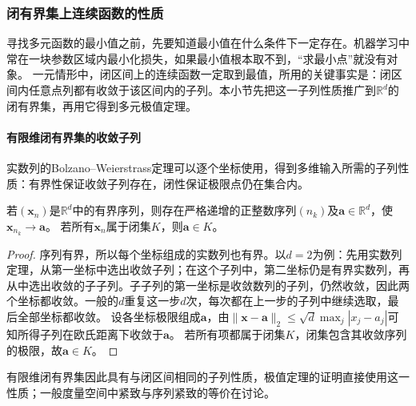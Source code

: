 \subsubsection{闭有界集上连续函数的性质}

寻找多元函数的最小值之前，先要知道最小值在什么条件下一定存在。机器学习中常在一块参数区域内最小化损失，如果最小值根本取不到，“求最小点”就没有对象。
一元情形中，闭区间上的连续函数一定取到最值，所用的关键事实是：闭区间内任意点列都有收敛于该区间内的子列。本小节先把这一子列性质推广到$\mathbb R^d$的闭有界集，再用它得到多元极值定理。

\paragraph{有限维闭有界集的收敛子列}
实数列的Bolzano--Weierstrass定理可以逐个坐标使用，得到多维输入所需的子列性质：有界性保证收敛子列存在，闭性保证极限点仍在集合内。
\begin{theorem}[有限维有界序列的收敛子列]
\label{thm:multivariable-bolzano-weierstrass}
若$(\bm x_n)$是$\mathbb R^d$中的有界序列，则存在严格递增的正整数序列$(n_k)$及$\bm a\in\mathbb R^d$，使$\bm x_{n_k}\to\bm a$。
若所有$\bm x_n$属于闭集$K$，则$\bm a\in K$。
\end{theorem}
\begin{proof}
序列有界，所以每个坐标组成的实数列也有界。以$d=2$为例：先用实数列定理，从第一坐标中选出收敛子列；在这个子列中，第二坐标仍是有界实数列，再从中选出收敛的子子列。子子列的第一坐标是收敛数列的子列，仍然收敛，因此两个坐标都收敛。一般的$d$重复这一步$d$次，每次都在上一步的子列中继续选取，最后全部坐标都收敛。
设各坐标极限组成$\bm a$，由$\lVert\bm x-\bm a\rVert_2\leq\sqrt d\max_j|x_j-a_j|$可知所得子列在欧氏距离下收敛于$\bm a$。
若所有项都属于闭集$K$，闭集包含其收敛序列的极限，故$\bm a\in K$。
\end{proof}
有限维闭有界集因此具有与闭区间相同的子列性质，极值定理的证明直接使用这一性质；一般度量空间中紧致与序列紧致的等价在讨论。

